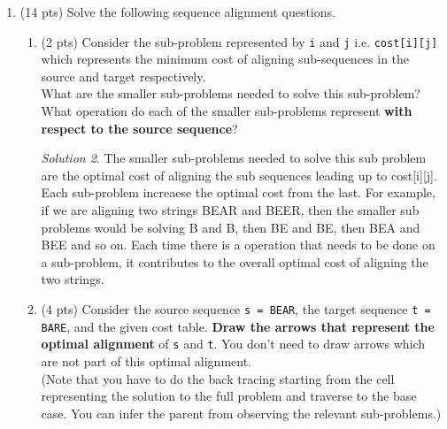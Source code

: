 \documentclass[12pt]{article}
\theoremstyle{remark}
\newtheorem*{solution}{Solution}
\begin{document}
\begin{enumerate}
\begin{enumerate}
\begin{solution}
Requests Selected = \{1, 2, 3\} Total: 30 \\ This is the optimal solution because if we look at the DP table, when a new event is considered, the 3 that line up the best are 1, 2, and 3. These 3 events cover the entire time almost exactly and contain the two highest values.
\end{solution}
\end{enumerate}

\pagebreak
\item (14 pts) Solve the following sequence alignment questions.

\begin{enumerate}
    \item (2 pts) Consider the sub-problem represented by \texttt{i} and \texttt{j}  i.e. \texttt{cost[i][j]} which represents the minimum cost of aligning sub-sequences in the source and target respectively.\\
    What are the smaller sub-problems needed to solve this sub-problem? \\What operation do each of the smaller sub-problems represent \textbf{with respect to the source sequence}?
    \begin{solution}
    The smaller sub-problems needed to solve this sub problem are the optimal cost of aligning the sub sequences leading up to cost[i][j]. Each sub-problem increaese the optimal cost from the last. For example, if we are aligning two strings BEAR and BEER, then the smaller sub problems would be solving B and B, then BE and BE, then BEA and BEE and so on. Each time there is a operation that needs to be done on a sub-problem, it contributes to the overall optimal cost of aligning the two strings.
    \end{solution}
    
    \pagebreak
    \item (4 pts) Consider the source sequence \texttt{s = BEAR}, the target sequence \texttt{t = BARE}, 
    and the given cost table. \textbf{Draw the arrows that represent the optimal alignment} of \texttt{s} and \texttt{t}. You don't need to draw arrows which are not part of this optimal alignment.
    \\(Note that you have to do the back tracing starting from the cell representing the solution to the full problem and traverse to the base case. You can infer the parent from observing the relevant sub-problems.)  
    

\end{enumerate}
\end{enumerate}
\end{document}
